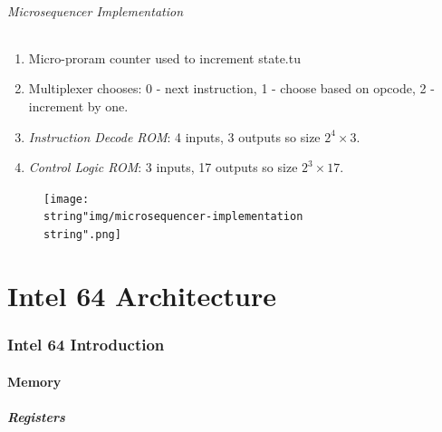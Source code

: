 \documentclass[twocolumn,english]{article}
\begin{document}
\paragraph{Microsequencer Implementation}
\begin{enumerate}
\item Micro-proram counter used to increment state.tu
\item Multiplexer chooses: 0 - next instruction, 1 - choose based on opcode,
2 - increment by one.
\item \emph{Instruction Decode ROM}: 4 inputs, 3 outputs so size $2^{4}\times3$.
\item \emph{Control Logic ROM}: 3 inputs, 17 outputs so size $2^{3}\times17$.
\end{enumerate}
\begin{figure}[H]
\noindent \centering{}\texttt{[image: \\string"img/microsequencer-implementation\\string".png]}
\end{figure}



\part{Intel 64 Architecture}


\section{Intel 64 Introduction}


\subsection{Memory}


\subsubsection{Registers}
\end{document}
